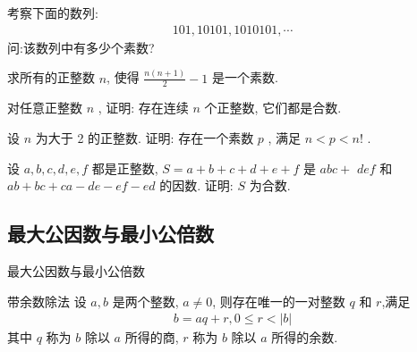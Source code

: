 \documentclass[aspectratio=169]{ctexbeamer}
\theoremstyle{definition}
\begin{document}
\begin{frame}[t]
	\begin{example}
		考察下面的数列:
		\begin{align*}
			101,10101,1010101, \cdots
		\end{align*}
		问:该数列中有多少个素数?
	\end{example}
\end{frame}

\begin{frame}[t]
	\begin{example}
		求所有的正整数 $n$, 使得 $\frac{n(n+1)}{2}-1$ 是一个素数.
	\end{example}
\end{frame}

\begin{frame}[t]
	\begin{example}
		对任意正整数 $n$ , 证明: 存在连续 $n$ 个正整数, 它们都是合数.
	\end{example}
\end{frame}

\begin{frame}[t]
	\begin{example}
		设 $n$ 为大于 2 的正整数. 证明: 存在一个素数 $p$ , 满足 $n<p<n!$ .
	\end{example}
\end{frame}

\begin{frame}[t]
	\begin{example}
		设 $a ,  b ,  c ,  d ,  e ,  f$ 都是正整数,  $S=a+b+c+d+e+f$ 是 $a b c+$ $d e f$ 和 $a b+b c+c a-d e-e f-e d$ 的因数. 证明: $S$ 为合数.
	\end{example}
\end{frame}
\subsection{最大公因数与最小公倍数}
\begin{frame}{最大公因数与最小公倍数}
	\begin{block}{带余数除法}
		设 $a ,  b$ 是两个整数, $a \neq 0$, 则存在唯一的一对整数 $q$ 和 $r$,满足
		\begin{align*}
			b=a q+r, 0 \leqslant r<|b|
		\end{align*}
		其中 $q$ 称为 $b$ 除以 $a$ 所得的商, $r$ 称为 $b$ 除以 $a$ 所得的余数.\\
	\end{block}
\end{frame}
\end{document}
